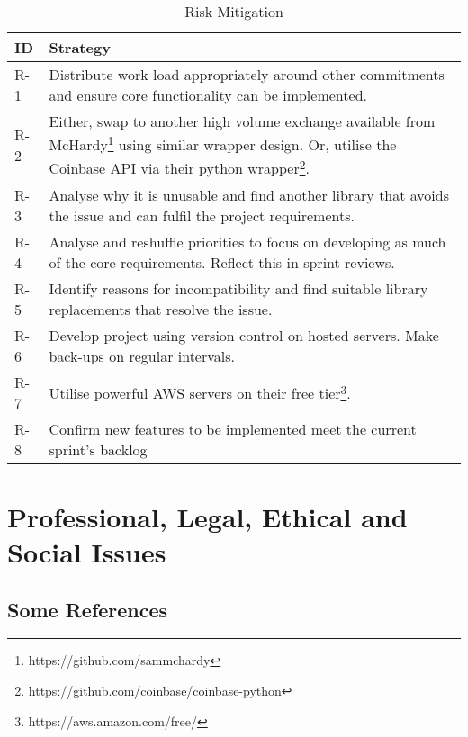 \begin{table}[htb!]
\centering
\begin{tabular}{|l|p{}|}
\hline
\textbf{ID} & \textbf{Strategy} \\ \hline\hline
R-1 & Distribute work load appropriately around other commitments and ensure core functionality can be implemented. \\ \hline
R-2 & Either, swap to another high volume exchange available from McHardy\footnote{https://github.com/sammchardy} using similar wrapper design. Or, utilise the Coinbase API via their python wrapper\footnote{https://github.com/coinbase/coinbase-python}. \\ \hline
R-3 & Analyse why it is unusable and find another library that avoids the issue and can fulfil the project requirements. \\ \hline
R-4 & Analyse and reshuffle priorities to focus on developing as much of the core requirements. Reflect this in sprint reviews. \\ \hline
R-5 & Identify reasons for incompatibility and find suitable library replacements that resolve the issue. \\ \hline
R-6 & Develop project using version control on hosted servers. Make back-ups on regular intervals. \\ \hline
R-7 & Utilise powerful AWS servers on their free tier\footnote{https://aws.amazon.com/free/}. \\ \hline
R-8 & Confirm new features to be implemented meet the current sprint's backlog  \\ \hline
\end{tabular}
\caption{Risk Mitigation}
\label{table:management:risk_mitigation}
\end{table}




\section{Professional, Legal, Ethical and Social Issues}
\label{sec:management:plesi}



\subsection{Some References}
\label{sec:management:results:refs}

